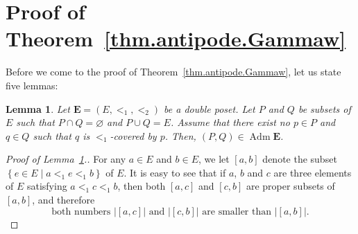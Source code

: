 \documentclass[12pt]{article}
\theoremstyle{plain}
\newtheorem{lemma}[theorem]{Lemma}
\theoremstyle{definition}
\theoremstyle{remark}
\newcommand{\Adm}{\operatorname{Adm}}
\newcommand{\EE}{{\mathbf{E}}}
\begin{document}
\section{Proof of Theorem~\ref{thm.antipode.Gammaw}}
\label{sect.proof}

Before we come to the proof of Theorem~\ref{thm.antipode.Gammaw},
let us state five lemmas:

\begin{lemma}
\label{lem.admissible.cover}
Let $\EE = \left(E, <_1, <_2\right)$ be a double poset.
Let $P$ and $Q$ be subsets of $E$ such that
$P \cap Q = \varnothing$ and $P \cup Q = E$.
Assume that there exist no $p \in P$ and $q \in Q$ such that
$q$ is $<_1$-covered by $p$. Then, $\left(P, Q\right) \in
\Adm \EE$.
\end{lemma}

\begin{proof}[Proof of Lemma~\ref{lem.admissible.cover}.]
For any $a \in E$ and $b \in E$, we let $\left[a, b\right]$
denote the subset \newline
$\left\{e \in E \mid a <_1 e <_1 b\right\}$ of $E$. It is
easy to see that if $a$, $b$ and $c$ are three elements of
$E$ satisfying $a <_1 c <_1 b$, then
both $\left[a, c\right]$ and $\left[c, b\right]$ are proper
subsets of $\left[a, b\right]$, and therefore
\begin{equation}
\text{both numbers }
\left|\left[a, c\right]\right| \text{ and }
\left|\left[c, b\right]\right| \text{ are smaller than }
\left|\left[a, b\right]\right|.
\label{pf.lem.admissible.cover.1}
\end{equation}


\end{proof}
\end{document}
